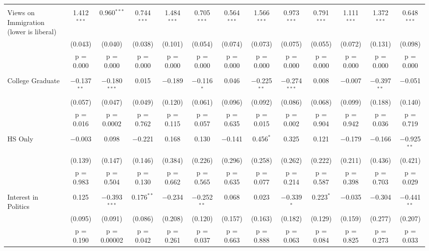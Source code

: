\begin{longtable}{@{\extracolsep{5pt}}lcccccccccccc}
  & & & & & & & & & & & & \\ 
 Views on Immigration (lower is liberal) & 1.412$^{***}$ & 0.960$^{***}$ & 0.744$^{***}$ & 1.484$^{***}$ & 0.705$^{***}$ & 0.564$^{***}$ & 1.566$^{***}$ & 0.973$^{***}$ & 0.791$^{***}$ & 1.111$^{***}$ & 1.372$^{***}$ & 0.648$^{***}$ \\ 
  & (0.043) & (0.040) & (0.038) & (0.101) & (0.054) & (0.074) & (0.073) & (0.075) & (0.055) & (0.072) & (0.131) & (0.098) \\ 
  & p = 0.000 & p = 0.000 & p = 0.000 & p = 0.000 & p = 0.000 & p = 0.000 & p = 0.000 & p = 0.000 & p = 0.000 & p = 0.000 & p = 0.000 & p = 0.000 \\ 
  & & & & & & & & & & & & \\ 
 College Graduate & $-$0.137$^{**}$ & $-$0.180$^{***}$ & 0.015 & $-$0.189 & $-$0.116$^{*}$ & 0.046 & $-$0.225$^{**}$ & $-$0.274$^{***}$ & 0.008 & $-$0.007 & $-$0.397$^{**}$ & $-$0.051 \\ 
  & (0.057) & (0.047) & (0.049) & (0.120) & (0.061) & (0.096) & (0.092) & (0.086) & (0.068) & (0.099) & (0.188) & (0.140) \\ 
  & p = 0.016 & p = 0.0002 & p = 0.762 & p = 0.115 & p = 0.057 & p = 0.635 & p = 0.015 & p = 0.002 & p = 0.904 & p = 0.942 & p = 0.036 & p = 0.719 \\ 
  & & & & & & & & & & & & \\ 
 HS Only & $-$0.003 & 0.098 & $-$0.221 & 0.168 & 0.130 & $-$0.141 & 0.456$^{*}$ & 0.325 & 0.121 & $-$0.179 & $-$0.166 & $-$0.925$^{**}$ \\ 
  & (0.139) & (0.147) & (0.146) & (0.384) & (0.226) & (0.296) & (0.258) & (0.262) & (0.222) & (0.211) & (0.436) & (0.421) \\ 
  & p = 0.983 & p = 0.504 & p = 0.130 & p = 0.662 & p = 0.565 & p = 0.635 & p = 0.077 & p = 0.214 & p = 0.587 & p = 0.398 & p = 0.703 & p = 0.029 \\ 
  & & & & & & & & & & & & \\ 
 Interest in Politics & 0.125 & $-$0.393$^{***}$ & 0.176$^{**}$ & $-$0.234 & $-$0.252$^{**}$ & 0.068 & 0.023 & $-$0.339$^{*}$ & 0.223$^{*}$ & $-$0.035 & $-$0.304 & $-$0.441$^{**}$ \\ 
  & (0.095) & (0.091) & (0.086) & (0.208) & (0.120) & (0.157) & (0.163) & (0.182) & (0.129) & (0.159) & (0.277) & (0.207) \\ 
  & p = 0.190 & p = 0.00002 & p = 0.042 & p = 0.261 & p = 0.037 & p = 0.663 & p = 0.888 & p = 0.063 & p = 0.084 & p = 0.825 & p = 0.273 & p = 0.033 \\ 

\end{longtable}
